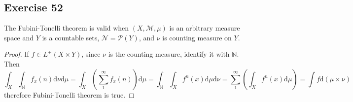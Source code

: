 \subsection*{Exercise 52}
The Fubini-Tonelli theorem is valid when $(X,\mathcal{M},\mu)$ is an arbitrary measure space and $Y$ is a countable sets, $\mathcal{N}=\mathcal{P}(Y)$, and $\nu$ is counting measure on $Y$.
\begin{proof}
    If $f\in L^+(X\times Y)$, since $\nu$ is the counting measure, identify it with $\mathbb{N}$. Then
    $$
    \int_X\int_{\mathbb{N}}f_x(n)\mathrm{d}\nu\mathrm{d}\mu=\int_X\left(\sum^\infty_1f_x(n)\right)\mathrm{d}\mu=\int_{\mathbb{N}}\int_Xf^n(x)\mathrm{d}\mu\mathrm{d}\nu=\sum^\infty_1\left(\int_Xf^n(x)\mathrm{d}\mu\right)=\int f\mathrm{d}(\mu\times\nu)
    $$
    therefore Fubini-Tonelli theorem is true.
\end{proof}